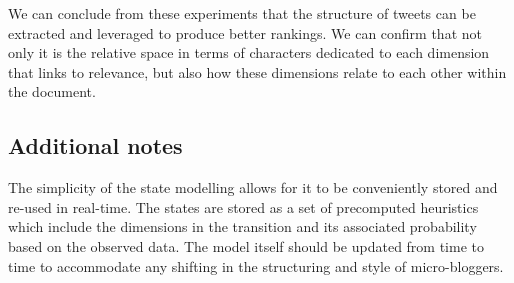 %
%
%
%
%
%
%
%
%
%
%
%
%
%


We can conclude from these experiments that the structure of tweets can be extracted and leveraged to produce better rankings. We can confirm that not only it is the relative space in terms of characters dedicated to each dimension that links to relevance, but also how these dimensions relate to each other within the document.



\subsection{Additional notes}

The simplicity of the state modelling allows for it to be conveniently stored and re-used in real-time. The states are stored as a set of precomputed heuristics which include the dimensions in the transition and its associated probability based on the observed data. The model itself should be updated from time to time to accommodate any shifting in the structuring and style of micro-bloggers.

